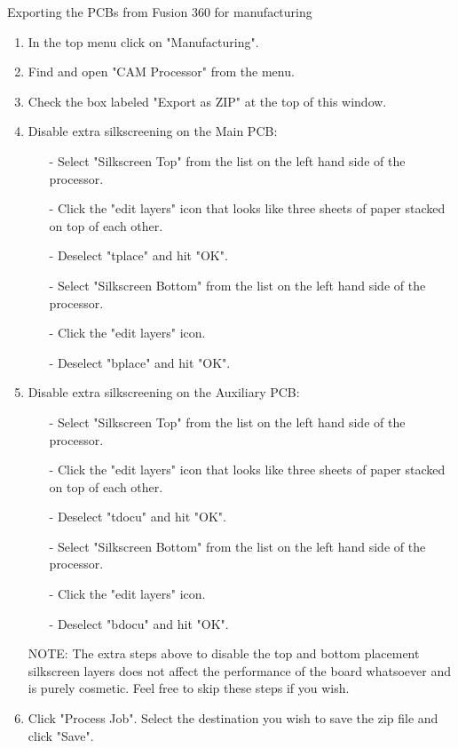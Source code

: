 \begin{subsubsec}{Exporting the PCBs from Fusion 360 for manufacturing}
\begin{enumerate}
    \begin{itemize}
        \item[-] Alternately, if you see there is multiple tabs already opened, you can more easily click the PCB Design file there as well. 
    \end{itemize}
    \item In the top menu click on "Manufacturing".
    \item Find and open "CAM Processor" from the menu.
    \item Check the box labeled "Export as ZIP" at the top of this window. 
    \item Disable extra silkscreening on the Main PCB:
    \begin{itemize}
        \item[-] Select "Silkscreen Top" from the list on the left hand side of the processor. 
        \item[-] Click the "edit layers" icon that looks like three sheets of paper stacked on top of each other. 
        \item[-] Deselect "tplace" and hit "OK".
        \item[-] Select "Silkscreen Bottom" from the list on the left hand side of the processor. 
        \item[-] Click the "edit layers" icon.
        \item[-] Deselect "bplace" and hit "OK".
    \end{itemize}
    
    \item Disable extra silkscreening on the Auxiliary PCB:
    \begin{itemize}
        \item[-] Select "Silkscreen Top" from the list on the left hand side of the processor. 
        \item[-] Click the "edit layers" icon that looks like three sheets of paper stacked on top of each other. 
        \item[-] Deselect "tdocu" and hit "OK".
        \item[-] Select "Silkscreen Bottom" from the list on the left hand side of the processor. 
        \item[-] Click the "edit layers" icon.
        \item[-] Deselect "bdocu" and hit "OK".
    \end{itemize}
    NOTE: The extra steps above to disable the top and bottom placement silkscreen layers does not affect the performance of the board whatsoever and is purely cosmetic. Feel free to skip these steps if you wish. 
    \item Click "Process Job". Select the destination you wish to save the zip file and click "Save". 
\end{enumerate}



\end{subsubsec}
